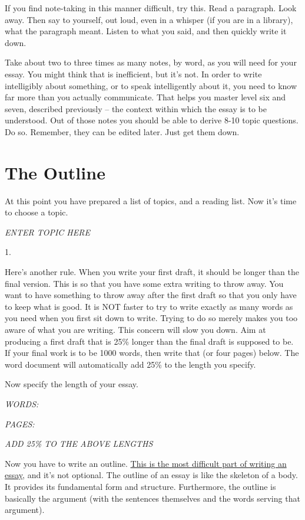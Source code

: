 \documentclass{article}
\begin{document}
If you find note-taking in this manner difficult, try this. Read a
paragraph. Look away. Then say to yourself, out loud, even in a whisper
(if you are in a library), what the paragraph meant. Listen to what you
said, and then quickly write it down.

Take about two to three times as many notes, by word, as you will need
for your essay. You might think that is inefficient, but it's not. In
order to write intelligibly about something, or to speak intelligently
about it, you need to know far more than you actually communicate. That
helps you master level six and seven, described previously -- the
context within which the essay is to be understood. Out of those notes
you should be able to derive 8-10 topic questions. Do so. Remember, they
can be edited later. Just get them down.

\textbf{\hfill\break}

\section{The Outline}

At this point you have prepared a list of topics, and a reading list.
Now it's time to choose a topic.

\emph{ENTER TOPIC HERE}

1.

Here's another rule. When you write your first draft, it should be
longer than the final version. This is so that you have some extra
writing to throw away. You want to have something to throw away after
the first draft so that you only have to keep what is good. It is NOT
faster to try to write exactly as many words as you need when you first
sit down to write. Trying to do so merely makes you too aware of what
you are writing. This concern will slow you down. Aim at producing a
first draft that is 25\% longer than the final draft is supposed to be.
If your final work is to be 1000 words, then write that (or four pages)
below. The word document will automatically add 25\% to the length you
specify.

Now specify the length of your essay.

\emph{WORDS:}

\emph{PAGES:}

\emph{ADD 25\% TO THE ABOVE LENGTHS}

Now you have to write an outline. \ul{This is the most difficult part of
writing an essay}, and it's not optional. The outline of an essay is
like the skeleton of a body. It provides its fundamental form and
structure. Furthermore, the outline is basically the argument (with the
sentences themselves and the words serving that argument).
\end{document}
